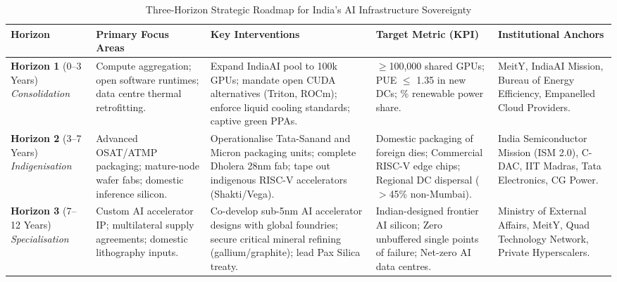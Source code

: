 \documentclass[conference,a4paper]{IEEEtran}
\begin{document}
\begin{table}[t]
\caption{Three-Horizon Strategic Roadmap for India's AI Infrastructure Sovereignty}
\begin{center}
\begin{tabularx}{\textwidth}{lp{4.2cm}p{4.2cm}p{3.5cm}X}
\toprule
\textbf{Horizon} & \textbf{Primary Focus Areas} & \textbf{Key Interventions} & \textbf{Target Metric (KPI)} & \textbf{Institutional Anchors} \\
\midrule
\textbf{Horizon 1} \newline (0--3 Years) \newline \textit{Consolidation} & Compute aggregation; open software runtimes; data centre thermal retrofitting. & Expand IndiaAI pool to 100k GPUs; mandate open CUDA alternatives (Triton, ROCm); enforce liquid cooling standards; captive green PPAs. & $\ge$100,000 shared GPUs; \newline PUE $\le$ 1.35 in new DCs; \newline 40\% renewable power share. & MeitY, IndiaAI Mission, \newline Bureau of Energy Efficiency, \newline Empanelled Cloud Providers. \\
\addlinespace
\textbf{Horizon 2} \newline (3--7 Years) \newline \textit{Indigenisation} & Advanced OSAT/ATMP packaging; mature-node wafer fabs; domestic inference silicon. & Operationalise Tata-Sanand and Micron packaging units; complete Dholera 28nm fab; tape out indigenous RISC-V accelerators (Shakti/Vega). & Domestic packaging of foreign dies; \newline Commercial RISC-V edge chips; \newline Regional DC dispersal ($>$45\% non-Mumbai). & India Semiconductor Mission (ISM 2.0), \newline C-DAC, IIT Madras, \newline Tata Electronics, CG Power. \\
\addlinespace
\textbf{Horizon 3} \newline (7--12 Years) \newline \textit{Specialisation} & Custom AI accelerator IP; multilateral supply agreements; domestic lithography inputs. & Co-develop sub-5nm AI accelerator designs with global foundries; secure critical mineral refining (gallium/graphite); lead Pax Silica treaty. & Indian-designed frontier AI silicon; \newline Zero unbuffered single points of failure; \newline Net-zero AI data centres. & Ministry of External Affairs, \newline MeitY, Quad Technology Network, \newline Private Hyperscalers. \\
\bottomrule
\end{tabularx}
\label{tab:roadmap}
\end{center}
\end{table}
\end{document}
